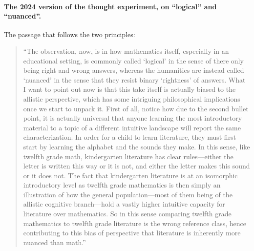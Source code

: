 \paragraph{The 2024 version of the thought experiment, on ``logical'' and ``nuanced''.} The passage that follows the two principles:
\begin{quote}
``The observation, now, is in how mathematics itself, especially in an educational setting, is commonly called `logical' in the sense of there only being right and wrong answers, whereas the humanities are instead called `nuanced' in the sense that they resist binary `rightness' of answers. What I want to point out now is that this take itself is actually biased to the allistic perspective, which has some intriguing philosophical implications once we start to unpack it. First of all, notice how due to the second bullet point, it is actually universal that anyone learning the most introductory material to a topic of a different intuitive landscape will report the same characterization. In order for a child to learn literature, they must first start by learning the alphabet and the sounds they make. In this sense, like twelfth grade math, kindergarten literature has clear rules---either the letter is written this way or it is not, and either the letter makes this sound or it does not. The fact that kindergarten literature is at an isomorphic introductory level as twelfth grade mathematics is then simply an illustration of how the general population---most of them being of the allistic cognitive branch---hold a vastly higher intuitive capacity for literature over mathematics. So in this sense comparing twelfth grade mathematics to twelfth grade literature is the wrong reference class, hence contributing to this bias of perspective that literature is inherently more nuanced than math.''
\end{quote}

